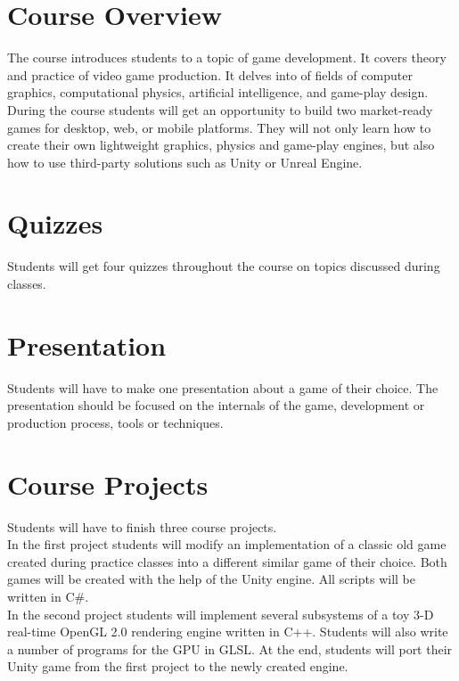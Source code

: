 \documentclass[12pt,a4paper,oneside]{article}
\begin{document}
    \section{Course Overview}

        The course introduces students to a topic of game development. It covers
        theory and practice of video game production. It delves into of fields
        of computer graphics, computational physics, artificial intelligence,
        and game-play design. During the course students will get an opportunity
        to build two market-ready games for desktop, web, or mobile platforms.
        They will not only learn how to create their own lightweight graphics,
        physics and game-play engines, but also how to use third-party solutions
        such as Unity or Unreal Engine.

    \section{Quizzes}

        Students will get four quizzes throughout the course on topics discussed
        during classes.

    \section{Presentation}

        Students will have to make one presentation about a game of their
        choice.  The presentation should be focused on the internals of the
        game, development or production process, tools or techniques.

    \section{Course Projects}

        Students will have to finish three course projects.\\

        In the first project students will modify an implementation of a classic
        old game created during practice classes into a different similar game
        of their choice. Both games will be created with the help of the Unity
        engine. All scripts will be written in C\#.\\

        In the second project students will implement several subsystems of a
        toy 3-D real-time OpenGL 2.0 rendering engine written in C++. Students
        will also write a number of programs for the GPU in GLSL. At the end,
        students will port their Unity game from the first project to the newly
        created engine.\\
\end{document}
